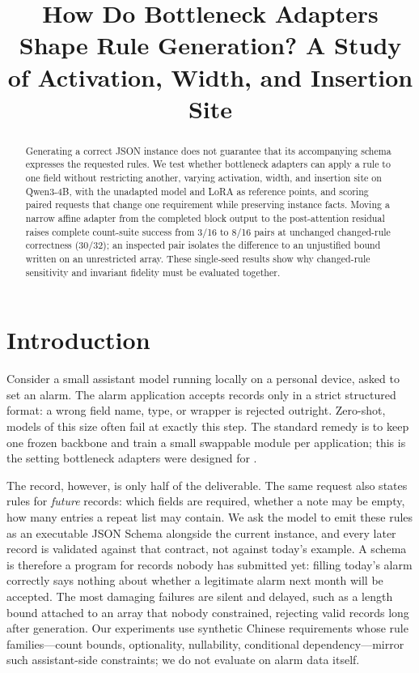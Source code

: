 \title{How Do Bottleneck Adapters Shape Rule Generation? A Study of Activation, Width, and Insertion Site}
\PaperAuthor
\maketitle

\begin{abstract}
Generating a correct JSON instance does not guarantee that its accompanying schema expresses the requested rules. We test whether bottleneck adapters can apply a rule to one field without restricting another, varying activation, width, and insertion site on Qwen3-4B, with the unadapted model and LoRA as reference points, and scoring paired requests that change one requirement while preserving instance facts. Moving a narrow affine adapter from the completed block output to the post-attention residual raises complete count-suite success from 3/16 to 8/16 pairs at unchanged changed-rule correctness (30/32); an inspected pair isolates the difference to an unjustified bound written on an unrestricted array. These single-seed results show why changed-rule sensitivity and invariant fidelity must be evaluated together.
\end{abstract}

\section{Introduction}
Consider a small assistant model running locally on a personal device, asked to set an alarm. The alarm application accepts records only in a strict structured format: a wrong field name, type, or wrapper is rejected outright. Zero-shot, models of this size often fail at exactly this step. The standard remedy is to keep one frozen backbone and train a small swappable module per application; this is the setting bottleneck adapters were designed for \citep{houlsby2019}.

The record, however, is only half of the deliverable. The same request also states rules for \emph{future} records: which fields are required, whether a note may be empty, how many entries a repeat list may contain. We ask the model to emit these rules as an executable JSON Schema alongside the current instance, and every later record is validated against that contract, not against today's example. A schema is therefore a program for records nobody has submitted yet: filling today's alarm correctly says nothing about whether a legitimate alarm next month will be accepted. The most damaging failures are silent and delayed, such as a length bound attached to an array that nobody constrained, rejecting valid records long after generation. Our experiments use synthetic Chinese requirements whose rule families---count bounds, optionality, nullability, conditional dependency---mirror such assistant-side constraints; we do not evaluate on alarm data itself.

